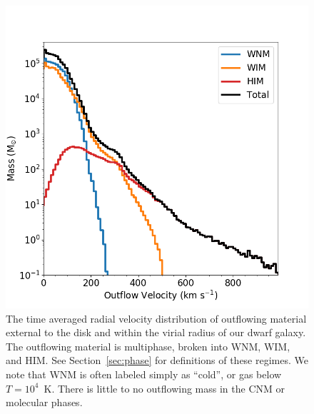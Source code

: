 \documentclass[twocolumn]{aastex61}
\begin{document}
\begin{figure}
\centering
\includegraphics[width=0.95\linewidth]{outflow_velocity_distribution}
\caption{The time averaged radial velocity distribution of outflowing material external to the disk and within the virial radius of our dwarf galaxy. The outflowing material is multiphase, broken into WNM, WIM, and HIM. See Section~\ref{sec:phase} for definitions of these regimes. We note that WNM is often labeled simply as ``cold'', or gas below $T = 10^{4}$~K. There is little to no outflowing mass in the CNM or molecular phases.}
\label{fig:outflow_velocity}
\end{figure}
\end{document}
